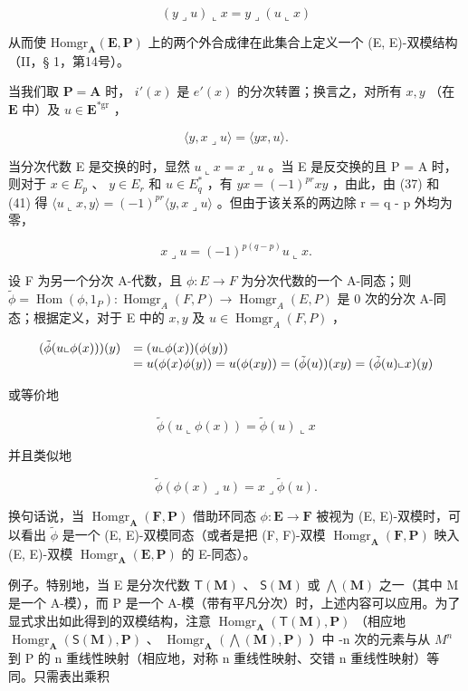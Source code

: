 \[
(y \lrcorner u) \llcorner x = y \lrcorner (u \llcorner x)\tag{40}
\]

从而使 \(\mathrm{Homgr}_{\mathbf{A}}(\mathbf{E},\mathbf{P})\) 上的两个外合成律在此集合上定义一个 (E, E)-双模结构（II，§ 1，第14号）。

当我们取 \(\mathbf{P} = \mathbf{A}\) 时， \(i'(x)\) 是 \(e'(x)\) 的分次转置；换言之，对所有 \(x, y\) （在 \(\mathbf{E}\) 中）及 \(u \in \mathbf{E}^{*\mathrm{gr}}\) ，

\[
\langle y, x \lrcorner u \rangle = \langle y x, u \rangle .\tag{41}
\]

当分次代数 E 是交换的时，显然 \(u \llcorner x = x \lrcorner u\) 。当 E 是反交换的且 P = A 时，则对于 \(x \in E_{p}\) 、 \(y \in E_{r}\) 和 \(u \in E_{q}^{*}\) ，有 \(yx = (-1)^{pr}xy\) ，由此，由 (37) 和 (41) 得 \(\langle u \llcorner x, y \rangle = (-1)^{pr}\langle y, x \lrcorner u \rangle\) 。但由于该关系的两边除 r = q - p 外均为零，

\[
x \lrcorner u = (- 1) ^ {p (q - p)} u \llcorner x.
\]

设 F 为另一个分次 A-代数，且 \(\phi: E \to F\) 为分次代数的一个 A-同态；则 \(\tilde{\phi} = \operatorname{Hom}(\phi, 1_{P}): \operatorname{Homgr}_{A}(F, P) \to \operatorname{Homgr}_{A}(E, P)\) 是 0 次的分次 A-同态；根据定义，对于 E 中的 \(x, y\) 及 \(u \in \operatorname{Homgr}_{A}(F, P)\) ，

\[
\begin{array}{r l} (\tilde {\phi} (u \llcorner \phi (x))) (y) & = (u \llcorner \phi (x)) (\phi (y)) \\ & = u (\phi (x) \phi (y)) = u (\phi (x y)) = (\tilde {\phi} (u)) (x y) = (\tilde {\phi} (u) \llcorner x) (y) \end{array}
\]

或等价地

\[
\tilde {\phi} (u \llcorner \phi (x)) = \tilde {\phi} (u) \llcorner x\tag{42}
\]

并且类似地

\[
\tilde {\phi} (\phi (x) \lrcorner u) = x \lrcorner \tilde {\phi} (u).\tag{43}
\]

换句话说，当 \(\operatorname{Homgr}_{\mathbf{A}}(\mathbf{F}, \mathbf{P})\) 借助环同态 \(\phi: \mathbf{E} \to \mathbf{F}\) 被视为 (E, E)-双模时，可以看出 \(\tilde{\phi}\) 是一个 (E, E)-双模同态（或者是把 (F, F)-双模 \(\operatorname{Homgr}_{\mathbf{A}}(\mathbf{F}, \mathbf{P})\) 映入 (E, E)-双模 \(\operatorname{Homgr}_{\mathbf{A}}(\mathbf{E}, \mathbf{P})\) 的 E-同态）。

例子。特别地，当 E 是分次代数 \(\mathsf{T}(\mathbf{M})\) 、 \(\mathsf{S}(\mathbf{M})\) 或 \(\bigwedge(\mathbf{M})\) 之一（其中 M 是一个 A-模），而 P 是一个 A-模（带有平凡分次）时，上述内容可以应用。为了显式求出如此得到的双模结构，注意 \(\operatorname{Homgr}_{\mathbf{A}}(\mathsf{T}(\mathbf{M}),\mathbf{P})\) （相应地 \(\operatorname{Homgr}_{\mathbf{A}}(\mathsf{S}(\mathbf{M}),\mathbf{P})\) 、 \(\operatorname{Homgr}_{\mathbf{A}}(\bigwedge(\mathbf{M}),\mathbf{P})\) ）中 -n 次的元素与从 \(M^{n}\) 到 P 的 n 重线性映射（相应地，对称 n 重线性映射、交错 n 重线性映射）等同。只需表出乘积

